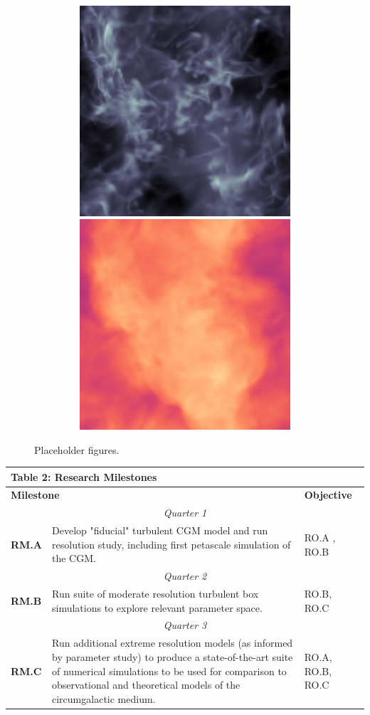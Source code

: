 \documentclass[11pt,letterpaper,english]{article}
\begin{document}
\begin{figure}[h]
\centering
\includegraphics[width=4.52in, height=3.08in, keepaspectratio=true]{turbulence_logd}
\includegraphics[width=4.52in, height=3.08in, keepaspectratio=true]{turbulence_logT}
\caption{Placeholder figures.}
\label{fig:turbulence}
\end{figure}

\begin{table}[h]
\vspace{-.12in}
\begin{tabular}{|l|p{4.6in}|l|} 
\multicolumn{3}{l}{\bf{Table 2: Research Milestones}}\\
\hline
\multicolumn{2}{|l|}{\bf Milestone} & {\bf Objective} \\ \hline
\multicolumn{3}{|c|}{\it Quarter 1} \\ \hline
\textbf{RM.A} & Develop "fiducial" turbulent CGM model and run resolution study, including first petascale simulation of the CGM. & RO.A , RO.B \\ \hline
\multicolumn{3}{|c|}{\it Quarter 2} \\ \hline
\textbf{RM.B} & Run suite of moderate resolution turbulent box simulations to explore relevant parameter space. & RO.B, RO.C\\ \hline
\multicolumn{3}{|c|}{\it Quarter 3} \\ \hline
\textbf{RM.C} & Run additional extreme resolution models (as informed by parameter study) to produce a state-of-the-art suite of numerical simulations to be used for comparison to observational and theoretical models of the circumgalactic medium. & RO.A, RO.B, RO.C \\ 
\hline
\end{tabular}
\end{table}
\end{document}
